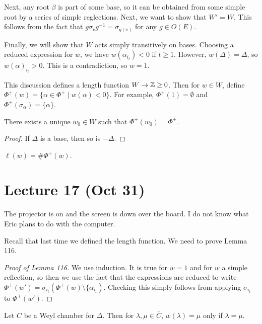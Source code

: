 \documentclass[twoside, 10pt]{article}
\begin{document}
    Next, any root $\beta$ is part of some base, so it can be obtained from some simple root by a series of simple reglections. Next, we want to show that $W' = W$. This follows from the fact that $g \sigma_v g^{-1} = \sigma_{g(v)}$ for any $g \in O(E)$.

    Finally, we will show that $W$ acts simply transitively on bases. Choosing a reduced expression for $w$, we have $w(\alpha_{i_t}) < 0$ if $t \geq 1$. However, $w(\Delta) = \Delta$, so $w(\alpha)_{i_t} > 0$. This is a contradiction, so $w = 1$.

    This discussion defines a length function $W \to \mathbb{Z} \geq 0$. Then for $w \in W$, define $\Phi^+(w) = \{ \alpha \in \Phi^+ \mid w(\alpha) < 0 \}$. For example, $\Phi^+(1) = \emptyset$ and $\Phi^+(\sigma_{\alpha}) = \{\alpha\}$.

    \begin{prop}
        There exists a unique $w_0 \in W$ such that $\Phi^+(w_0) = \Phi^+$.
    \end{prop}

    \begin{proof}
        If $\Delta$ is a base, then so is $-\Delta$.
    \end{proof}

    \begin{lem}
        $\ell(w) = \# \Phi^+(w)$.
    \end{lem}

     \section{Lecture 17 (Oct 31)}%
    \label{sec:lecture_17_oct_31_}

    The projector is on and the screen is down over the board. I do not know what Eric plans to do with the computer.

    Recall that last time we defined the length function. We need to prove Lemma 116.
    \begin{proof}[Proof of Lemma 116]
        We use induction. It is true for $w=1$ and for $w$ a simple reflection, so then we use the fact that the expressions are reduced to write $\Phi^+(w') = \sigma_{i_t}(\Phi^+(w) \setminus \{\alpha_{i_t})$. Checking this simply follows from applying $\sigma_{i_t}$ to $\Phi^+(w')$.
    \end{proof}

    \begin{lem}
        Let $C$ be a Weyl chamber for $\Delta$. Then for $\lambda, \mu \in \overline{C}$, $w(\lambda) = \mu$ only if $\lambda = \mu$.
    \end{lem}
\end{document}

